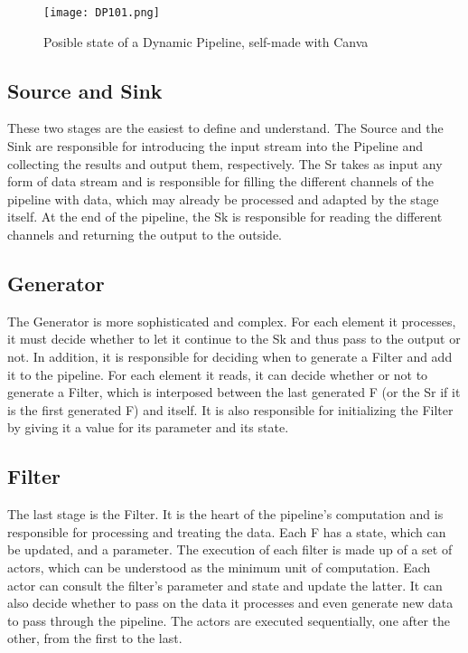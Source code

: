 \begin{figure}[H]
    \centering
    \texttt{[image: DP101.png]}
    \caption{Posible state of a Dynamic Pipeline, self-made with Canva}
    \label{fig:DP101}
\end{figure}

\subsection*{Source and Sink}
These two stages are the easiest to define and understand.
The Source and the Sink are responsible for introducing the input stream into the Pipeline and collecting the results and output them, respectively.
The Sr takes as input any form of data stream and is responsible for filling the different channels of the pipeline with data, which may already be processed and adapted by the stage itself.
At the end of the pipeline, the Sk is responsible for reading the different channels and returning the output to the outside.

\subsection*{Generator}
The Generator is more sophisticated and complex.
For each element it processes, it must decide whether to let it continue to the Sk and thus pass to the output or not.
In addition, it is responsible for deciding when to generate a Filter and add it to the pipeline.
For each element it reads, it can decide whether or not to generate a Filter, which is interposed between the last generated F (or the Sr if it is the first generated F) and itself.
It is also responsible for initializing the Filter by giving it a value for its parameter and its state.

\subsection*{Filter}
The last stage is the Filter.
It is the heart of the pipeline's computation and is responsible for processing and treating the data.
Each F has a state, which can be updated, and a parameter.
The execution of each filter is made up of a set of actors, which can be understood as the minimum unit of computation.
Each actor can consult the filter's parameter and state and update the latter.
It can also decide whether to pass on the data it processes and even generate new data to pass through the pipeline.
The actors are executed sequentially, one after the other, from the first to the last.

